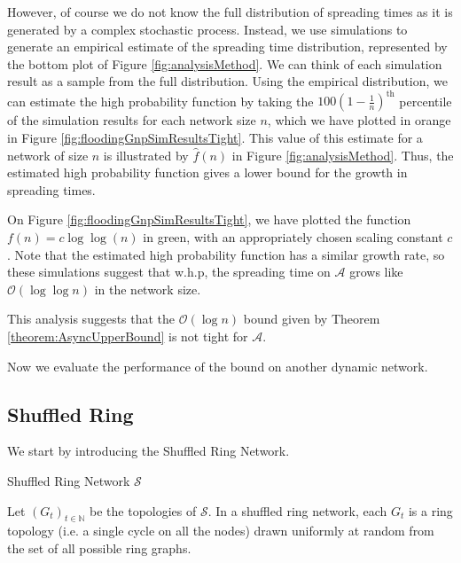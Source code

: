 However, of course we do not know the full distribution of spreading times as it is generated by a complex stochastic process. Instead, we use simulations to generate an empirical estimate of the spreading time distribution, represented by the bottom plot of Figure \ref{fig:analysisMethod}. We can think of each simulation result as a sample from the full distribution. Using the empirical distribution, we can estimate the high probability function by taking the $100(1-\frac{1}{n})^\text{th}$ percentile of the simulation results for each network size $n$, which we have plotted in orange in Figure \ref{fig:floodingGnpSimResultsTight}. This value of this estimate for a network of size $n$ is illustrated by $\hat{f}(n)$ in Figure \ref{fig:analysisMethod}. Thus, the estimated high probability function gives a lower bound for the growth in spreading times. %

On Figure \ref{fig:floodingGnpSimResultsTight}, we have plotted the function $f(n) = c \log \log (n)$ in green, with an appropriately chosen scaling constant $c$. Note that the estimated high probability function has a similar growth rate, so these simulations suggest that w.h.p, the spreading time on $\mathcal{A}$ grows like $\mathcal{O}(\log \log n)$ in the network size.

This analysis suggests that the $\mathcal{O}(\log n)$ bound given by Theorem \ref{theorem:AsyncUpperBound} is not tight for $\mathcal{A}$.

Now we evaluate the performance of the bound on another dynamic network.

\subsection{Shuffled Ring}\label{section:shuffledRingAsyncApplication}

We start by introducing the Shuffled Ring Network.

\begin{definition}
	Shuffled Ring Network $\mathcal{S}$

	Let $(G_t)_{t \in \mathbb{N}}$ be the topologies of $\mathcal{S}$. In a shuffled ring network, each $G_t$ is a ring topology (i.e. a single cycle on all the nodes) drawn uniformly at random from the set of all possible ring graphs. 
\end{definition}

